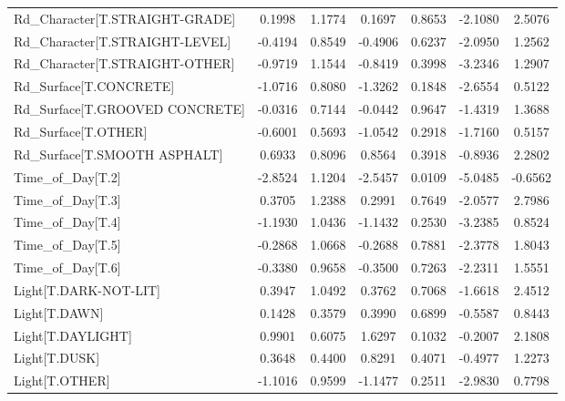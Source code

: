 \begin{longtable}{p{4cm}cccccc}
Rd\_Character[T.STRAIGHT-GRADE]                     &  0.1998 &    1.1774 &  0.1697 &       0.8653 & -2.1080 &  2.5076 \\
Rd\_Character[T.STRAIGHT-LEVEL]                     & -0.4194 &    0.8549 & -0.4906 &       0.6237 & -2.0950 &  1.2562 \\
Rd\_Character[T.STRAIGHT-OTHER]                     & -0.9719 &    1.1544 & -0.8419 &       0.3998 & -3.2346 &  1.2907 \\
Rd\_Surface[T.CONCRETE]                             & -1.0716 &    0.8080 & -1.3262 &       0.1848 & -2.6554 &  0.5122 \\
Rd\_Surface[T.GROOVED CONCRETE]                     & -0.0316 &    0.7144 & -0.0442 &       0.9647 & -1.4319 &  1.3688 \\
Rd\_Surface[T.OTHER]                                & -0.6001 &    0.5693 & -1.0542 &       0.2918 & -1.7160 &  0.5157 \\
Rd\_Surface[T.SMOOTH ASPHALT]                       &  0.6933 &    0.8096 &  0.8564 &       0.3918 & -0.8936 &  2.2802 \\
Time\_of\_Day[T.2]                                   & -2.8524 &    1.1204 & -2.5457 &       0.0109 & -5.0485 & -0.6562 \\
Time\_of\_Day[T.3]                                   &  0.3705 &    1.2388 &  0.2991 &       0.7649 & -2.0577 &  2.7986 \\
Time\_of\_Day[T.4]                                   & -1.1930 &    1.0436 & -1.1432 &       0.2530 & -3.2385 &  0.8524 \\
Time\_of\_Day[T.5]                                   & -0.2868 &    1.0668 & -0.2688 &       0.7881 & -2.3778 &  1.8043 \\
Time\_of\_Day[T.6]                                   & -0.3380 &    0.9658 & -0.3500 &       0.7263 & -2.2311 &  1.5551 \\
Light[T.DARK-NOT-LIT]                              &  0.3947 &    1.0492 &  0.3762 &       0.7068 & -1.6618 &  2.4512 \\
Light[T.DAWN]                                      &  0.1428 &    0.3579 &  0.3990 &       0.6899 & -0.5587 &  0.8443 \\
Light[T.DAYLIGHT]                                  &  0.9901 &    0.6075 &  1.6297 &       0.1032 & -0.2007 &  2.1808 \\
Light[T.DUSK]                                      &  0.3648 &    0.4400 &  0.8291 &       0.4071 & -0.4977 &  1.2273 \\
Light[T.OTHER]                                     & -1.1016 &    0.9599 & -1.1477 &       0.2511 & -2.9830 &  0.7798 \\

\end{longtable}
